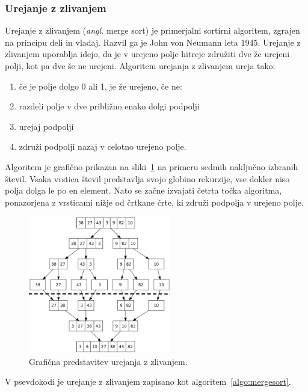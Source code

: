 \documentclass[a4paper,oneside,12pt]{article}
\begin{document}
\subsubsection{Urejanje z zlivanjem}
\label{chapter:mergesort}
Urejanje z zlivanjem (\emph{angl.} merge sort) je primerjalni sortirni algoritem, 
zgrajen na principu deli in vladaj. Razvil ga je John von Neumann leta 1945.
Urejanje z zlivanjem uporablja idejo, da je v urejeno polje hitreje združiti dve že
urejeni polji, kot pa dve še ne urejeni. 
Algoritem urejanja z zlivanjem ureja tako:
\begin{enumerate}
  \item če je polje dolgo 0 ali 1, je že urejeno, če ne:
  \item razdeli polje v dve približno enako dolgi podpolji
  \item urejaj podpolji 
  \item združi podpolji nazaj v celotno urejeno polje.
\end{enumerate}

Algoritem je grafično prikazan na sliki~\ref{fig:mergesortimage} na primeru sedmih
naključno izbranih števil.
Vsaka vrstica števil predstavlja svojo globino rekurzije, vse dokler niso polja dolga le
po en element. Nato se začne izvajati četrta točka algoritma, ponazorjena z vrsticami
nižje od črtkane črte, ki združi podpolja v urejeno polje.

\begin{figure}[ht]
    \begin{center}
        \includegraphics[height=60mm]{slike/merge_sort.png}
    \end{center}
    \vspace{-0.7cm}
    \caption[Urejanje z zlivanjem]{Grafična predstavitev urejanja z zlivanjem.}
    \label{fig:mergesortimage}
\end{figure}

V psevdokodi je urejanje z zlivanjem zapisano kot algoritem~\ref{algo:mergesort}. 
\end{document}
